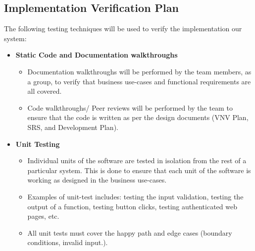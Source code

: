 \documentclass[12pt, titlepage]{article}
\begin{document}
\subsection{Implementation Verification Plan}
The following testing techniques will be used to verify the implementation our system:
\begin{itemize}
  \item[] {\textbf{Static Code and Documentation walkthroughs}}
  \begin{itemize}
    \item{Documentation walkthroughs will be performed by the team members, as a group, to verify that business use-cases and functional requirements are all covered.}
    \item{Code walkthroughs/ Peer reviews will be performed by the team to ensure that the code is written as per the design documents (VNV Plan, SRS, and Development Plan).}
  \end{itemize}

  \item[]{\textbf{Unit Testing}}
  \begin{itemize}
    \item{Individual units of the software are tested in isolation from the rest of a particular system. This is done to ensure that each unit of the software is working as designed in the business use-cases.}
    \item{Examples of unit-test includes: testing the input validation, testing the output of a function, testing button clicks, testing authenticated web pages, etc.}
    \item{All unit tests must cover the happy path and edge cases (boundary conditions, invalid input.).}
  \end{itemize}
  

\end{itemize}
\end{document}
